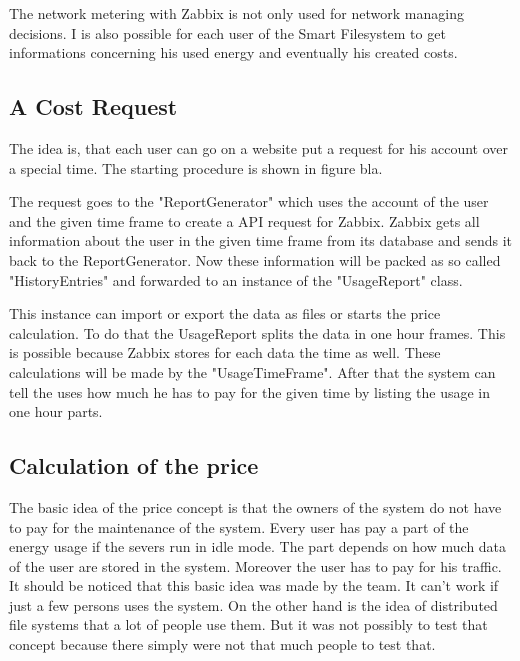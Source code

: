 The network metering with Zabbix is not only used for network managing  decisions. I is also possible for each user of the Smart Filesystem to get informations concerning his used energy and eventually his created costs.
\subsection{A Cost Request}
 The idea is, that each user can go on a website put a request for his account over a special time. The starting procedure is shown in figure bla. 


 The request goes to the "ReportGenerator" which uses the account of the user and the given time frame to create a API request for Zabbix. Zabbix gets all information about the user in the given time frame from its database and sends it back to the ReportGenerator. Now these information will be packed as so called "HistoryEntries" and forwarded to an instance of the "UsageReport" class. 
 
 This instance can import or export the data as files or starts the price calculation. To do that the UsageReport splits the data in one hour frames. This is possible because Zabbix stores for each data the time as well. These calculations will be made by the "UsageTimeFrame". After that the system can tell the uses how much he has to pay for the given time by listing the usage in one hour parts.
 
 \subsection{Calculation of the price} 
 The basic idea of the price concept is that the owners of the system do not have to pay for the maintenance of the system. Every user has pay a part of the energy usage if the severs run in idle mode. The part depends on how much data of the user are stored in the system. Moreover the user has to pay for his traffic. It should be noticed that this basic idea was made by the team. It can't work if just a few persons uses the system. On the other hand is the idea of distributed file systems that a lot of people use them. But it was not possibly to test that concept because there simply were not that much people to test that. 
 

